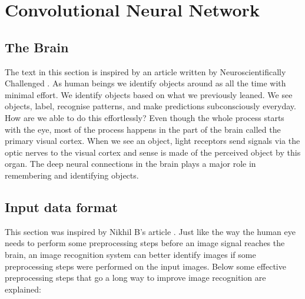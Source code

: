 \documentclass[12pt, a4paper,oneside]{report}
\begin{document}
\section{Convolutional Neural Network}

\subsection{The Brain}
The text in this section is inspired by an article written by Neuroscientifically Challenged \cite{brain}. As human beings we identify objects around as all the time with minimal effort. We identify objects based on what we previously leaned. We see objects, label, recognise patterns, and make predictions subconsciously everyday. How are we able to do this effortlessly? Even though the whole process starts with the eye, most of the process happens in the part of the brain called the primary visual cortex. When we see an object, light receptors send signals via the optic nerves to the visual cortex and sense is made of the perceived object by this organ. The deep neural connections in the brain plays a major role in remembering and identifying objects.

\subsection{Input data format}
This section was inspired by Nikhil B's article \cite{input}. Just like the way the human eye needs to perform some preprocessing steps before an image signal reaches the brain, an image recognition system can better identify images if some preprocessing steps were performed on the input images. Below some effective preprocessing steps that go a long way to improve image recognition are explained:
\end{document}
